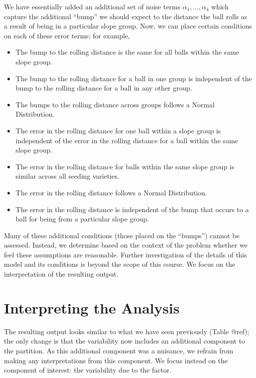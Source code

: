 \documentclass[]{book}
\providecommand{\tightlist}{%
  \setlength{\itemsep}{0pt}\setlength{\parskip}{0pt}}
\theoremstyle{definition}
\theoremstyle{definition}
\theoremstyle{definition}
\theoremstyle{remark}
\begin{document}
We have essentially added an additional set of noise terms
\(\alpha_1, \dotsc, \alpha_4\) which capture the additional ``bump'' we
should expect to the distance the ball rolls as a result of being in a
particular slope group. Now, we can place certain conditions on each of
these error terms; for example,

\begin{itemize}
\tightlist
\item
  The bump to the rolling distance is the same for all balls within the
  same slope group.
\item
  The bump to the rolling distance for a ball in one group is
  independent of the bump to the rolling distance for a ball in any
  other group.
\item
  The bumps to the rolling distance across groups follows a Normal
  Distribution.
\item
  The error in the rolling distance for one ball within a slope group is
  independent of the error in the rolling distance for a ball within the
  same slope group.
\item
  The error in the rolling distance for balls within the same slope
  group is similar across all seeding varieties.
\item
  The error in the rolling distance follows a Normal Distribution.
\item
  The error in the rolling distance is independent of the bump that
  occurs to a ball for being from a particular slope group.
\end{itemize}

Many of these additional conditions (those placed on the ``bumps'')
cannot be assessed. Instead, we determine based on the context of the
problem whether we feel these assumptions are reasonable. Further
investigation of the details of this model and its conditions is beyond
the scope of this course. We focus on the interpretation of the
resulting output.

\section{Interpreting the Analysis}\label{interpreting-the-analysis}

The resulting output looks similar to what we have seen previously
(Table @ref); the only change is that the variability now includes an
additional component to the partition. As this additional component was
a nuisance, we refrain from making any interpretations from this
component. We focus instead on the component of interest: the
variability due to the factor.
\end{document}
